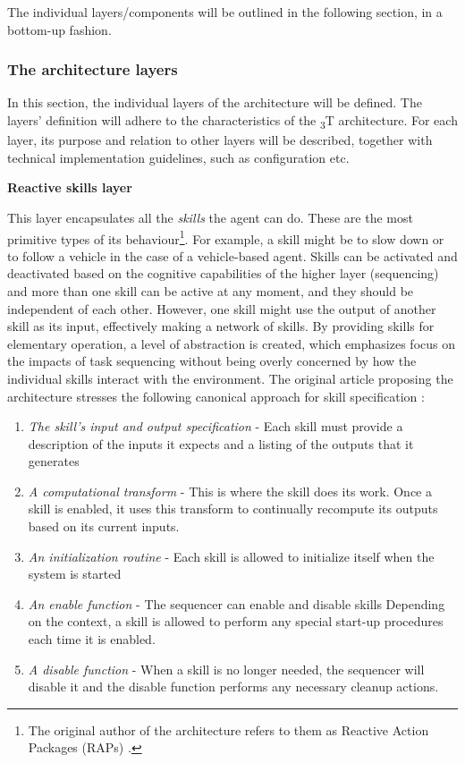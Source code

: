 \documentclass[0main.tex]{subfiles}
\begin{document}
The individual layers/components will be outlined in the following section, in a bottom-up
fashion.

\subsubsection{The architecture layers}

In this section, the individual layers of the architecture will be defined. The layers' definition will 
adhere to the characteristics of the \textsubscript{3}T architecture. For each layer, its purpose and 
relation to other layers will be described, together with technical implementation guidelines, such as 
configuration etc.

\textbf{Reactive skills layer}

This layer encapsulates all the \emph{skills} the agent can do. These are the 
most primitive types of its behaviour\footnote{The original author of the architecture refers to them 
as Reactive Action Packages (RAPs) \cite{Firby1987}.}. For example, a skill might be to slow
down or to follow a vehicle in the case of a vehicle-based agent. Skills can be activated and deactivated based 
on the cognitive capabilities of the higher layer (sequencing) and more than one skill can be active at 
any moment, and they should be independent of each other. However, one skill might use the output of another 
skill as its input, effectively making a network of skills. By providing skills for elementary operation,
a level of abstraction is created, which emphasizes focus on the impacts of task sequencing without being 
overly concerned by how the individual skills interact with the environment. The original article 
proposing the architecture stresses the following canonical approach for skill specification
\cite{Bonasso1995}:

\begin{enumerate}
    \item \emph{The skill's input and output specification} - Each skill must provide a
description of the inputs it expects and a listing of the outputs that it
generates 
    \item \emph{A computational transform} - This is where the skill does its work. Once a
skill is enabled, it uses this transform to continually recompute its outputs
based on its current inputs.
    \item \emph{An initialization routine} - Each skill is allowed to initialize itself when the system is started 
    \item \emph{An enable function} - The sequencer can enable and disable skills Depending on the
    context, a skill is allowed to perform any special start-up procedures each
    time it is enabled.
    \item \emph{A disable function} - When a skill is no longer needed, the sequencer will disable it
    and the disable function performs any necessary cleanup actions.
\end{enumerate}
\end{document}
